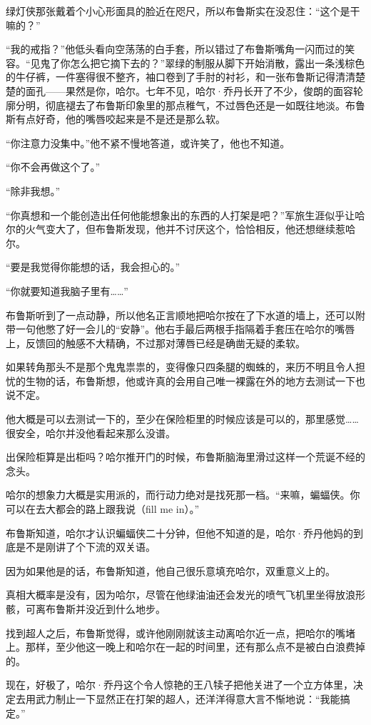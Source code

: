 \documentclass[../main]{subfiles}
\begin{document}
绿灯侠那张戴着个小心形面具的脸近在咫尺，所以布鲁斯实在没忍住：“这个是干嘛的？”

“我的戒指？”他低头看向空荡荡的白手套，所以错过了布鲁斯嘴角一闪而过的笑容。“见鬼了你怎么把它摘下去的？”翠绿的制服从脚下开始消散，露出一条浅棕色的牛仔裤，一件塞得很不整齐，袖口卷到了手肘的衬衫，和一张布鲁斯记得清清楚楚的面孔——果然是你，哈尔。七年不见，哈尔·乔丹长开了不少，俊朗的面容轮廓分明，彻底褪去了布鲁斯印象里的那点稚气，不过唇色还是一如既往地淡。布鲁斯有点好奇，他的嘴唇咬起来是不是还是那么软。

“你注意力没集中。”他不紧不慢地答道，或许笑了，他也不知道。

“你不会再做这个了。”

“除非我想。”

“你真想和一个能创造出任何他能想象出的东西的人打架是吧？”军旅生涯似乎让哈尔的火气变大了，但布鲁斯发现，他并不讨厌这个，恰恰相反，他还想继续惹哈尔。

“要是我觉得你能想的话，我会担心的。”

“你就要知道我脑子里有\ldots\ldots”

布鲁斯听到了一点动静，所以他名正言顺地把哈尔按在了下水道的墙上，还可以附带一句他憋了好一会儿的“安静”。他右手最后两根手指隔着手套压在哈尔的嘴唇上，反馈回的触感不大精确，不过那对薄唇已经是确凿无疑的柔软。

如果转角那头不是那个鬼鬼祟祟的，变得像只四条腿的蜘蛛的，来历不明且令人担忧的生物的话，布鲁斯想，他或许真的会用自己唯一裸露在外的地方去测试一下也说不定。

他大概是可以去测试一下的，至少在保险柜里的时候应该是可以的，那里感觉……很安全，哈尔并没他看起来那么没谱。

出保险柜算是出柜吗？哈尔推开门的时候，布鲁斯脑海里滑过这样一个荒诞不经的念头。

哈尔的想象力大概是实用派的，而行动力绝对是找死那一档。“来嘛，蝙蝠侠。你可以在去大都会的路上跟我说（fill
me in）。”

布鲁斯知道，哈尔才认识蝙蝠侠二十分钟，但他不知道的是，哈尔·乔丹他妈的到底是不是刚讲了个下流的双关语。

因为如果他是的话，布鲁斯知道，他自己很乐意填充哈尔，双重意义上的。

真相大概率是没有，因为哈尔，尽管在他绿油油还会发光的喷气飞机里坐得放浪形骸，可离布鲁斯并没近到什么地步。

找到超人之后，布鲁斯觉得，或许他刚刚就该主动离哈尔近一点，把哈尔的嘴堵上。那样，至少他这一晚上和哈尔在一起的时间里，还有那么点不是被白白浪费掉的。

现在，好极了，哈尔·乔丹这个令人惊艳的王八犊子把他关进了一个立方体里，决定去用武力制止一下显然正在打架的超人，还洋洋得意大言不惭地说：“我能搞定。”
\end{document}
